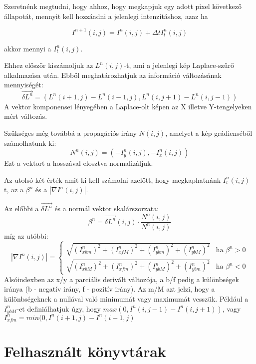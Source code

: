 \documentclass[10pt, draft]{article}
\begin{document}
Szeretnénk megtudni, hogy ahhoz, hogy megkapjuk egy adott pixel következő állapotát, mennyit kell hozzáadni a jelenlegi intenzitáshoz, azaz ha

\[ I^{n+1}(i, j) = I^n(i, j) + \Delta t I^{n}_{t} (i,j) \]

akkor mennyi a $I^{n}_t (i,j)$.

Ehhez először kiszámoljuk az $L^n (i, j)$-t, ami a jelenlegi kép Laplace-szűrő alkalmazása után.
Ebből meghatározhatjuk az információ változásának mennyiségét:
\[ \overrightarrow{\delta L^{n}} = (L^n(i+1,j) - L^n(i-1,j), L^n(i,j+1) - L^n(i,j-1)) \]
A vektor komponensei lényegében a Laplace-olt képen az X illetve Y-tengelyeken mért változás.

Szükséges még továbbá a propagációs irány $N(i, j)$, amelyet a kép grádienséből számolhatunk ki:
\[ N^{n}(i, j) = (-I^{n}_y(i, j), -I^{n}_x(i, j)) \]
Ezt a vektort a hosszával elosztva normalizáljuk.

Az utolsó két érték amit ki kell számolni azelőtt, hogy megkaphatnánk $I^{n}_t (i,j)$-t,
az a $ \beta^n $ és a $ | \nabla I^n(i, j) | $.

Az előbbi a $ \overrightarrow{ \delta L^n } $ és a normál vektor skalárszorzata:
\[ \beta^{n} = \overrightarrow{ \delta L^n }(i, j) \cdot \frac{ N^n (i, j) }{ N^n (i, j) } \]
míg az utóbbi:
\[ | \nabla I^n(i, j) | =
\begin{cases}
    \sqrt{(I^n_{x b m})^2 + (I^n_{x f M})^2 + (I^n_{y b m})^2 + (I^n_{y b M})^2} &\mbox{ha } \beta^n > 0 \\
    \sqrt{(I^n_{x b M})^2 + (I^n_{x f m})^2 + (I^n_{y b M})^2 + (I^n_{y b m})^2} &\mbox{ha } \beta^n < 0
\end{cases}
\]
Alsóindexben az x/y a parciális derivált változója, a b/f pedig a különbségek iránya (b - negatív irány, f - pozitív irány).
Az m/M azt jelzi, hogy a különbségeknek a nullával való minimumát vagy maximumát vesszük.
Például a $I^n_{y b M}$-et definiálhatjuk úgy, hogy $ max(0, I^n(i, j - 1) - I^n(i, j + 1)) $,
vagy $I^n_{x f m} = min(0, I^n(i + 1, j) - I^n(i - 1, j)$


\section{Felhasznált könyvtárak}

\printbibliography
\end{document}
